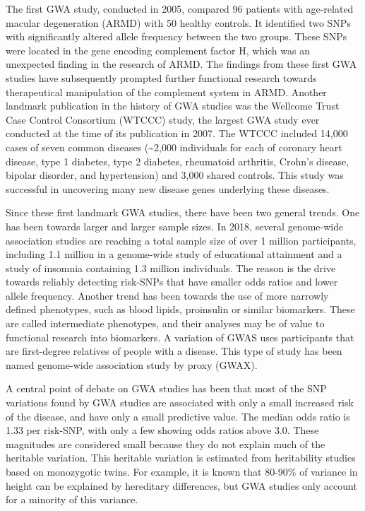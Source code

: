 The first GWA study, conducted in 2005, compared 96 patients with age-related macular degeneration (ARMD) with 50 healthy controls. It identified two SNPs with significantly altered allele frequency between the two groups. These SNPs were located in the gene encoding complement factor H, which was an unexpected finding in the research of ARMD. The findings from these first GWA studies have subsequently prompted further functional research towards therapeutical manipulation of the complement system in ARMD. Another landmark publication in the history of GWA studies was the Wellcome Trust Case Control Consortium (WTCCC) study, the largest GWA study ever conducted at the time of its publication in 2007. The WTCCC included 14,000 cases of seven common diseases (\textasciitilde{}2,000 individuals for each of coronary heart disease, type 1 diabetes, type 2 diabetes, rheumatoid arthritis, Crohn's disease, bipolar disorder, and hypertension) and 3,000 shared controls. This study was successful in uncovering many new disease genes underlying these diseases.

Since these first landmark GWA studies, there have been two general trends. One has been towards larger and larger sample sizes. In 2018, several genome-wide association studies are reaching a total sample size of over 1 million participants, including 1.1 million in a genome-wide study of educational attainment and a study of insomnia containing 1.3 million individuals. The reason is the drive towards reliably detecting risk-SNPs that have smaller odds ratios and lower allele frequency. Another trend has been towards the use of more narrowly defined phenotypes, such as blood lipids, proinsulin or similar biomarkers. These are called intermediate phenotypes, and their analyses may be of value to functional research into biomarkers. A variation of GWAS uses participants that are first-degree relatives of people with a disease. This type of study has been named genome-wide association study by proxy (GWAX).

A central point of debate on GWA studies has been that most of the SNP variations found by GWA studies are associated with only a small increased risk of the disease, and have only a small predictive value. The median odds ratio is 1.33 per risk-SNP, with only a few showing odds ratios above 3.0. These magnitudes are considered small because they do not explain much of the heritable variation. This heritable variation is estimated from heritability studies based on monozygotic twins. For example, it is known that 80-90\% of variance in height can be explained by hereditary differences, but GWA studies only account for a minority of this variance.

